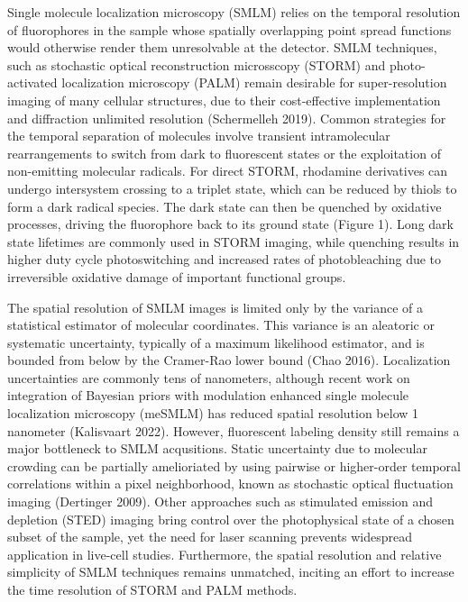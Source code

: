 \documentclass{ucetd}
\begin{document}
Single molecule localization microscopy (SMLM) relies on the temporal resolution of fluorophores in the sample whose spatially overlapping point spread functions would otherwise render them unresolvable at the detector. SMLM techniques, such as stochastic optical reconstruction microsscopy (STORM) and photo-activated localization microscopy (PALM) remain desirable for super-resolution imaging of many cellular structures, due to their cost-effective implementation and diffraction unlimited resolution (Schermelleh 2019). Common strategies for the temporal separation of molecules involve transient intramolecular rearrangements to switch from dark to fluorescent states or the exploitation of non-emitting molecular radicals. For direct STORM, rhodamine derivatives can undergo intersystem crossing to a triplet state, which can be reduced by thiols to form a dark radical species. The dark state can then be quenched by oxidative processes, driving the fluorophore back to its ground state (Figure 1). Long dark state lifetimes are commonly used in STORM imaging, while quenching results in higher duty cycle photoswitching and increased rates of photobleaching due to irreversible oxidative damage of important functional groups.

The spatial resolution of SMLM images is limited only by the variance of a statistical estimator of molecular coordinates. This variance is an aleatoric or systematic uncertainty, typically of a maximum likelihood estimator, and is bounded from below by the Cramer-Rao lower bound (Chao 2016). Localization uncertainties are commonly tens of nanometers, although recent work on integration of Bayesian priors with modulation enhanced single molecule localization microscopy (meSMLM) has reduced spatial resolution below 1 nanometer (Kalisvaart 2022). However, fluorescent labeling density still remains a major bottleneck to SMLM acqusitions. Static uncertainty due to molecular crowding can be partially amelioriated by using pairwise or higher-order temporal correlations within a pixel neighborhood, known as stochastic optical fluctuation imaging (Dertinger 2009). Other approaches such as stimulated emission and depletion (STED) imaging bring control over the photophysical state of a chosen subset of the sample, yet the need for laser scanning prevents widespread application in live-cell studies. Furthermore, the spatial resolution and relative simplicity of SMLM techniques remains unmatched, inciting an effort to increase the time resolution of STORM and PALM methods.
\end{document}
